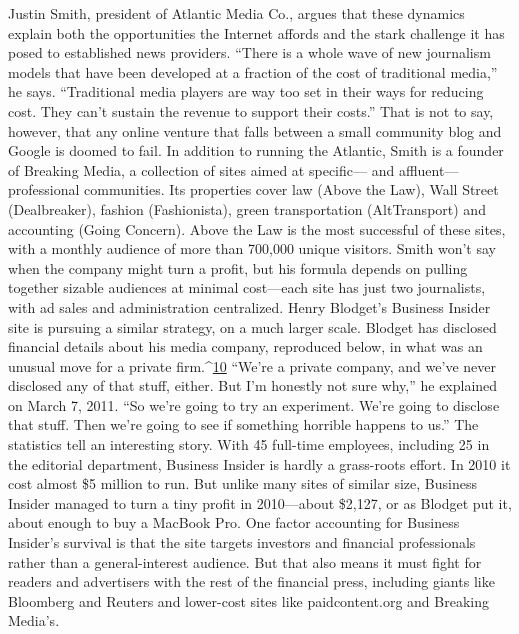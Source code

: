 Justin Smith, president of Atlantic Media Co., argues that these dynamics explain
both the opportunities the Internet affords and the stark challenge it has
posed to established news providers. ``There is a whole wave of new journalism
models that have been developed at a fraction of the cost of traditional media,''
he says. ``Traditional media players are way too set in their ways for reducing cost.
They can’t sustain the revenue to support their costs.''
That is not to say, however, that any online venture that falls between a small
community blog and Google is doomed to fail. In addition to running the Atlantic,
Smith is a founder of Breaking Media, a collection of sites aimed at specific—
and affluent—professional communities. Its properties cover law (Above
the Law), Wall Street (Dealbreaker), fashion (Fashionista), green transportation
(AltTransport) and accounting (Going Concern). Above the Law is the most
successful of these sites, with a monthly audience of more than 700,000 unique
visitors. Smith won’t say when the company might turn a profit, but his formula
depends on pulling together sizable audiences at minimal cost—each site has just
two journalists, with ad sales and administration centralized.
Henry Blodget’s Business Insider site is pursuing a similar strategy, on a much
larger scale. Blodget has disclosed financial details about his media company, reproduced
below, in what was an unusual move for a private firm.^{\href{#endnotes-ch7}{10}} ``We’re a private
company, and we’ve never disclosed any of that stuff, either. But I’m honestly
not sure why,'' he explained on March 7, 2011. ``So we’re going to try an experiment.
We’re going to disclose that stuff. Then we’re going to see if something
horrible happens to us.''
The statistics tell an interesting story. With 45 full-time employees, including
25 in the editorial department, Business Insider is hardly a grass-roots effort. In
2010 it cost almost \$5 million to run. But unlike many sites of similar size, Business
Insider managed to turn a tiny profit in 2010—about \$2,127, or as Blodget
put it, about enough to buy a MacBook Pro.
One factor accounting for Business Insider’s survival is that the site targets
investors and financial professionals rather than a general-interest audience. But
that also means it must fight for readers and advertisers with the rest of the financial
press, including giants like Bloomberg and Reuters and lower-cost sites like
paidcontent.org and Breaking Media’s.

